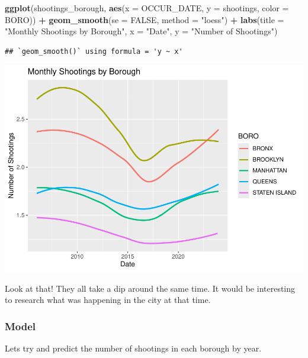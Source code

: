 \documentclass[
]{article}
\newenvironment{Shaded}{\begin{snugshade}}{\end{snugshade}}
\newcommand{\AttributeTok}[1]{\textcolor[rgb]{0.13,0.29,0.53}{#1}}
\newcommand{\ConstantTok}[1]{\textcolor[rgb]{0.56,0.35,0.01}{#1}}
\newcommand{\FunctionTok}[1]{\textcolor[rgb]{0.13,0.29,0.53}{\textbf{#1}}}
\newcommand{\NormalTok}[1]{#1}
\newcommand{\SpecialCharTok}[1]{\textcolor[rgb]{0.81,0.36,0.00}{\textbf{#1}}}
\newcommand{\StringTok}[1]{\textcolor[rgb]{0.31,0.60,0.02}{#1}}
\begin{document}
\begin{Shaded}
\begin{Highlighting}[]
\FunctionTok{ggplot}\NormalTok{(shootings\_borough, }\FunctionTok{aes}\NormalTok{(}\AttributeTok{x =}\NormalTok{ OCCUR\_DATE, }\AttributeTok{y =}\NormalTok{ shootings, }\AttributeTok{color =}\NormalTok{ BORO)) }\SpecialCharTok{+}
  \FunctionTok{geom\_smooth}\NormalTok{(}\AttributeTok{se =} \ConstantTok{FALSE}\NormalTok{, }\AttributeTok{method =} \StringTok{"loess"}\NormalTok{) }\SpecialCharTok{+}
  \FunctionTok{labs}\NormalTok{(}\AttributeTok{title =} \StringTok{"Monthly Shootings by Borough"}\NormalTok{,}
       \AttributeTok{x =} \StringTok{"Date"}\NormalTok{,}
       \AttributeTok{y =} \StringTok{"Number of Shootings"}\NormalTok{) }
\end{Highlighting}
\end{Shaded}

\begin{verbatim}
## `geom_smooth()` using formula = 'y ~ x'
\end{verbatim}

\includegraphics{nypd-shooting-data-analysis_files/figure-latex/trend-shootings-all-1.pdf}

Look at that! They all take a dip around the same time. It would be
interesting to research what was happening in the city at that time.

\subsubsection{Model}\label{model}

Lets try and predict the number of shootings in each borough by year.
\end{document}
